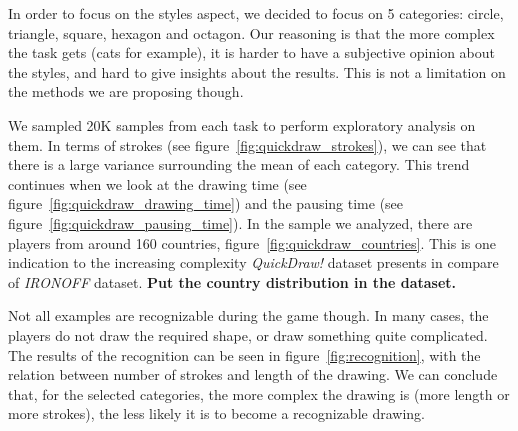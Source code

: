 \par In order to focus on the styles aspect, we decided to focus on 5 categories: circle, triangle, square, hexagon and octagon. Our reasoning is that the more complex the task gets (cats for example), it is harder to have a subjective opinion about the styles, and hard to give insights about the results. This is not a limitation on the methods we are proposing though.

\par We sampled 20K samples from each task to perform exploratory analysis on them. In terms of strokes (see figure~\ref{fig:quickdraw_strokes}), we can see that there is a large variance surrounding the mean of each category. This trend continues when we look at the drawing time (see figure~\ref{fig:quickdraw_drawing_time}) and the pausing time (see figure~\ref{fig:quickdraw_pausing_time}). In the sample we analyzed, there are players from around 160 countries, figure~\ref{fig:quickdraw_countries}. This is one indication to the increasing complexity \textit{QuickDraw!} dataset presents in compare of \textit{IRONOFF} dataset. \textbf{Put the country distribution in the dataset.}

\par Not all examples are recognizable during the game though. In many cases, the players do not draw the required shape, or draw something quite complicated. The results of the recognition can be seen in figure~\ref{fig:recognition}, with the relation between number of strokes and length of the drawing. We can conclude that, for the selected categories, the more complex the drawing is (more length or more strokes), the less likely it is to become a recognizable drawing.


